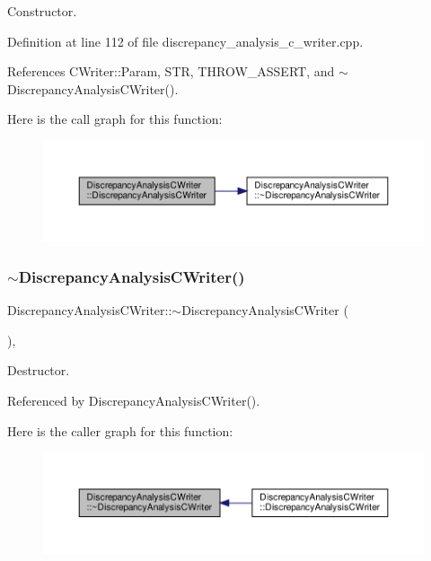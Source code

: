 Constructor. 



Definition at line 112 of file discrepancy\+\_\+analysis\+\_\+c\+\_\+writer.\+cpp.



References C\+Writer\+::\+Param, S\+TR, T\+H\+R\+O\+W\+\_\+\+A\+S\+S\+E\+RT, and $\sim$\+Discrepancy\+Analysis\+C\+Writer().

Here is the call graph for this function\+:
\nopagebreak
\begin{figure}[H]
\begin{center}
\leavevmode
\includegraphics[width=350pt]{d4/d5c/classDiscrepancyAnalysisCWriter_a19aa97789a4f8c8b4c52a4408d9bb3cc_cgraph}
\end{center}
\end{figure}
\mbox{\label{classDiscrepancyAnalysisCWriter_a17169eb934b2eb19f7d80fd07e260ec7}} 
\subsubsection{\texorpdfstring{$\sim$\+Discrepancy\+Analysis\+C\+Writer()}{~DiscrepancyAnalysisCWriter()}}
{\footnotesize\ttfamily Discrepancy\+Analysis\+C\+Writer\+::$\sim$\+Discrepancy\+Analysis\+C\+Writer (\begin{DoxyParamCaption}{ }\end{DoxyParamCaption})\hspace{0.3cm}{\ttfamily [override]}, {\ttfamily [default]}}



Destructor. 



Referenced by Discrepancy\+Analysis\+C\+Writer().

Here is the caller graph for this function\+:
\nopagebreak
\begin{figure}[H]
\begin{center}
\leavevmode
\includegraphics[width=350pt]{d4/d5c/classDiscrepancyAnalysisCWriter_a17169eb934b2eb19f7d80fd07e260ec7_icgraph}
\end{center}
\end{figure}



